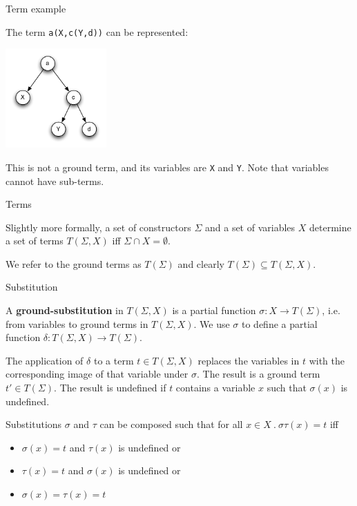 \documentclass{beamer}
\begin{document}
\begin{frame}{Term example}

The term \texttt{a(X,c(Y,d))} can be represented:

\begin{center}
\includegraphics[height=1.5in]{images/example-term-2}
\end{center}

This is not a ground term, and its variables are \texttt{X} and \texttt{Y}.
Note that variables cannot have sub-terms.

\end{frame}


\begin{frame}{Terms}

Slightly more formally, a set of constructors $\Sigma$ and a set of variables
$X$ determine a set of terms $T(\Sigma,X)$ iff $\Sigma \cap X = \emptyset$.

We refer to the ground terms as $T(\Sigma)$ and clearly $T(\Sigma) \subseteq
T(\Sigma,X)$.

\end{frame}


\begin{frame}{Substitution}

A \textbf{ground-substitution} in $T(\Sigma,X)$ is a partial function $\sigma
: X \to T(\Sigma)$, i.e. from variables to ground terms in $T(\Sigma,X)$. We
use $\sigma$ to define a partial function $\delta : T(\Sigma,X) \to
T(\Sigma)$.

The application of $\delta$ to a term $t \in T(\Sigma,X)$ replaces the
variables in $t$ with the corresponding image of that variable under $\sigma$.
The result is a ground term $t' \in T(\Sigma)$. The result is undefined if $t$
contains a variable $x$ such that $\sigma(x)$ is undefined.

Substitutions $\sigma$ and $\tau$ can be composed such that for all $x \in X
\:.\: \sigma\tau(x) = t$ iff

\begin{itemize}
  \item $\sigma(x) = t$ and $\tau(x)$ is undefined or
  \item $\tau(x) = t$ and $\sigma(x)$ is undefined or
  \item $\sigma(x) = \tau(x) = t$
\end{itemize}

\end{frame}
\end{document}
